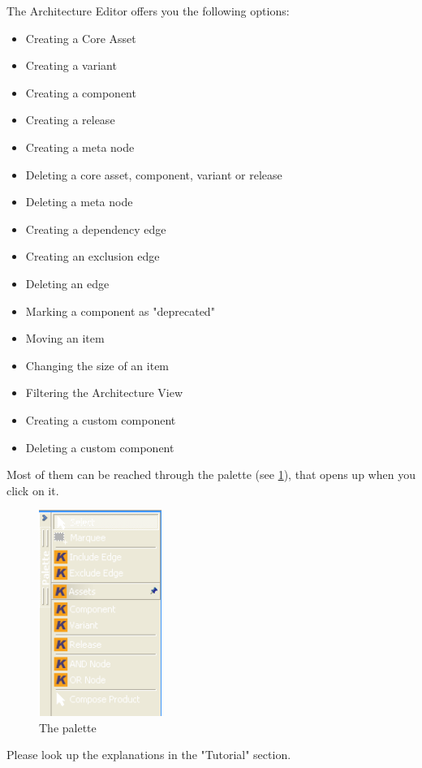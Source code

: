 The Architecture Editor offers you the following options:
\begin{itemize}
	\item Creating a Core Asset
	\item Creating a variant
	\item Creating a component
	\item Creating a release
	\item Creating a meta node
	\item Deleting a core asset, component, variant or release
	\item Deleting a meta node
	\item Creating a dependency edge
	\item Creating an exclusion edge
	\item Deleting an edge
	\item Marking a component as "deprecated"
	\item Moving an item
	\item Changing the size of an item
	\item Filtering the Architecture View
	\item Creating a custom component
	\item Deleting a custom component
\end{itemize}

Most of them can be reached through the palette (see \ref{palette}), that opens up when you click on it.

\begin{figure}[h!]
\begin{center}
\includegraphics[width=4cm]{palette.png}
   \caption{The palette}
\label{palette}
\end{center}
\end{figure}\par

Please look up the explanations in the "Tutorial" section.

